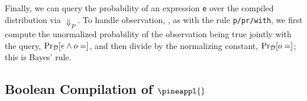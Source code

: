 

Finally, we can query the probability of an expression \texttt{e} over the
compiled distribution via $\Downarrow_P$. To handle observation, ,
as with the rule \texttt{p/pr/with},
we first compute the unormalized probability of the observation being
true jointly with the query, $\Pr_{\mathcal{D}}[e \land o = \tt]$, and then divide by the
normalizing constant, $\Pr_{\mathcal{D}}[o = \tt]$; this is Bayes' rule.

\subsection{Boolean Compilation of $\pineappl{}$}
\label{subsec:pineappl-compl}


